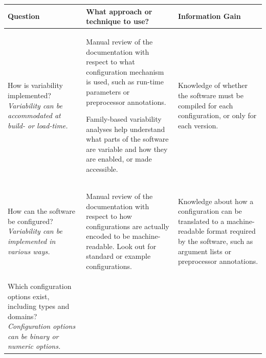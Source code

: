 \begin{table}
  \centering
  
  \begin{tabular}{L{0.22\textwidth} L{0.48\textwidth} L{0.3\textwidth}}
  
  	\toprule 
    {\bf Question} & {\bf What approach or technique to use?} & {\bf
    Information Gain} \\
    \midrule
    
    {How is variability implemented?\linebreak
	{\footnotesize\it Variability can be accommodated at build- or 	load-time.}} & 
	
	{\small\begin{compactitem}
	  \item Manual review of the documentation with respect to what configuration
	  mechanism is used, such as run-time parameters or preprocessor annotations.
	  \item Family-based variability analyses help understand what parts of the
	  software are variable and how they are enabled, or made accessible.	  
	\end{compactitem}} & 
	
	{Knowledge of whether the software must be compiled for each configuration, or only for each version.}\\
	
	\midrule
	
	{How can the software be configured?\linebreak
	{\footnotesize\it Variability can be implemented in various ways.}} &
	
	{\small\begin{compactitem}
	  \item Manual review of the documentation with respect to how configurations
	  are actually encoded to be machine-readable. Look out for standard or example
	  configurations.
	 \end{compactitem}}
	  &
	
	{Knowledge about how a configuration can be translated to a machine-readable
	format required by the software, such as argument lists or preprocessor annotations.}\\
	
	\midrule
	
	{Which configuration options exist, including types and domains?\linebreak
	{\footnotesize\it Configuration options can be binary or numeric options.}} & 
	

\end{tabular}
\end{table}
